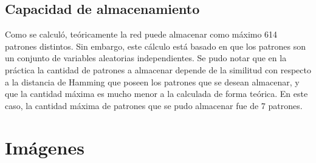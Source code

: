 \documentclass{article}
\begin{document}
 \subsection{Capacidad de almacenamiento}
 Como se calculó, teóricamente la red puede almacenar como máximo 614 patrones distintos. Sin embargo, este cálculo está basado en que los patrones
 son un conjunto de variables aleatorias independientes. Se pudo notar que en la práctica la cantidad de patrones a almacenar depende de
 la similitud con respecto a la distancia de Hamming que poseen los patrones que se desean almacenar, y que la cantidad máxima es mucho menor
 a la calculada de forma teórica. En este caso, la cantidad máxima de patrones que se pudo almacenar fue de 7 patrones.


\clearpage

\appendix
\section{Imágenes}
\end{document}
